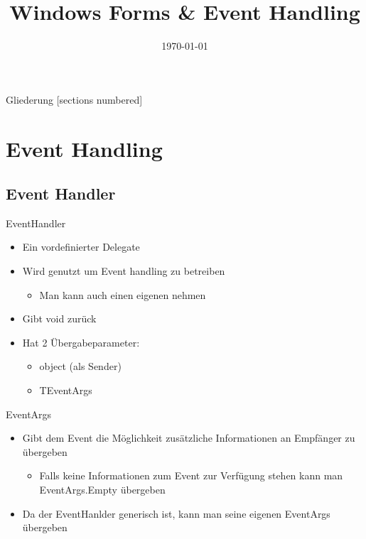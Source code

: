 



\title{Windows Forms \& Event Handling}
\date{\today}




\maketitle

\begin{frame}{Gliederung}
	[sections numbered]
	\tableofcontents
\end{frame}

\section{Event Handling}
\subsection{Event Handler}
\begin{frame}{EventHandler}
	\begin{itemize}
		\item Ein vordefinierter Delegate
		\item Wird genutzt um Event handling zu betreiben
		\begin{itemize}
			\item Man kann auch einen eigenen nehmen
		\end{itemize}
		\item Gibt \alert{void} zurück
		\item Hat 2 Übergabeparameter:
		\begin{itemize}
			\item \alert{object} (als Sender)
			\item \alert{TEventArgs}
		\end{itemize}
	\end{itemize}
		
\end{frame}

\begin{frame}{EventArgs}
	\begin{itemize}
		\item Gibt dem Event die Möglichkeit zusätzliche Informationen an Empfänger zu übergeben
		\begin{itemize}
			\item Falls keine Informationen zum Event zur Verfügung stehen kann man \alert{EventArgs.Empty} übergeben
		\end{itemize}
		\item Da der EventHanlder generisch ist, kann man seine eigenen \alert{EventArgs} übergeben
	\end{itemize}
	
\end{frame}

